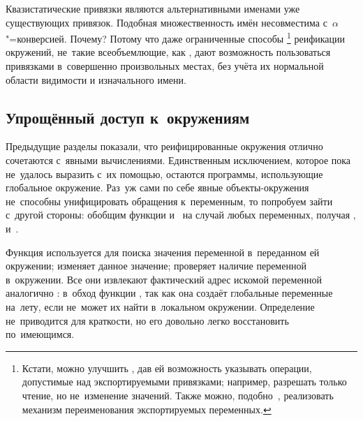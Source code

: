 Квазистатические привязки являются альтернативными именами уже существующих
привязок. Подобная множественность имён несовместима с~$\alpha$"=конверсией.%
 Почему? Потому что даже ограниченные способы%
\footnote{Кстати, можно улучшить , дав ей возможность
указывать операции, допустимые над экспортируемыми привязками; например,
разрешать только чтение, но не~изменение значений. Также можно,
подобно~\cite{lf93}, реализовать механизм переименования экспортируемых
переменных.} реификации окружений, не~такие всеобъемлющие, как
, дают возможность пользоваться привязками
в~совершенно произвольных местах, без учёта их нормальной области видимости и
изначального имени.


\subsection{Упрощённый доступ к~окружениям}%
\label{reflection/reify-env/ssect:simplified}

Предыдущие разделы показали, что реифицированные окружения отлично сочетаются
с~явными вычислениями. Единственным исключением, которое пока не~удалось
выразить с~их помощью, остаются программы, использующие глобальное окружение.
Раз~уж сами по себе явные объекты-окружения не~способны унифицировать обращения
к~переменным, то попробуем зайти с~другой стороны: обобщим функции
 и~ на случай любых переменных, получая
,  и~.

Функция  используется для поиска значения переменной
в~переданном ей окружении;  изменяет данное значение;
 проверяет наличие переменной в~окружении. Все они
извлекают фактический адрес искомой переменной аналогично :
в~обход функции , так как она создаёт глобальные переменные
на~лету, если не~может их найти в~локальном окружении. Определение
 не~приводится для краткости, но его довольно легко
восстановить по~имеющимся.

